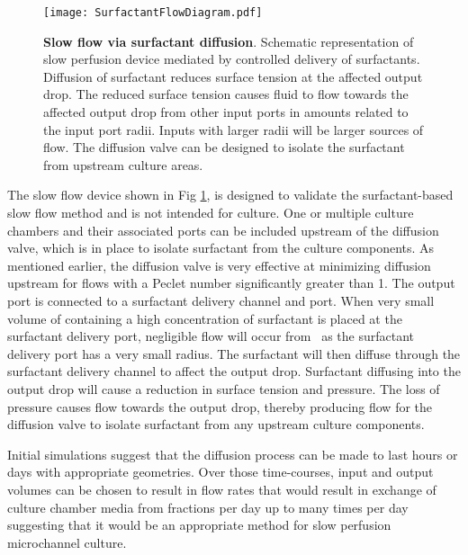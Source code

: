 \begin{figure}[!ht]
\centering
\texttt{[image: SurfactantFlowDiagram.pdf]}
\caption{\textbf{Slow flow via surfactant diffusion}. Schematic representation of slow perfusion device mediated by controlled delivery of surfactants. Diffusion of surfactant reduces surface tension at the affected output drop. The reduced surface tension causes fluid to flow towards the affected output drop from other input ports in amounts related to the input port radii. Inputs with larger radii will be larger sources of flow. The diffusion valve can be designed to isolate the surfactant from upstream culture areas.}
\label{fig:surfactantDevices}
\end{figure}

The slow flow device shown in Fig \ref{fig:surfactantDevices}, is designed to validate the surfactant-based slow flow method and is not intended for culture. One or multiple culture chambers and their associated ports can be included upstream of the diffusion valve, which is in place to isolate surfactant from the culture components. As mentioned earlier, the diffusion valve is very effective at minimizing diffusion upstream for flows with a Peclet number significantly greater than 1. The output port is connected to a surfactant delivery channel and port. When very small volume of containing a high concentration of surfactant is placed at the surfactant delivery port, negligible flow will occur from \pp\ as the surfactant delivery port has a very small radius. The surfactant will then diffuse through the surfactant delivery channel to affect the output drop. Surfactant diffusing into the output drop will cause a reduction in surface tension and pressure. The loss of pressure causes flow towards the output drop, thereby producing flow for the diffusion valve to isolate surfactant from any upstream culture components.


Initial simulations suggest that the diffusion process can be made to last hours or days with appropriate geometries. Over those time-courses, input and output volumes can be chosen to result in flow rates that would result in exchange of culture chamber media from fractions per day up to many times per day suggesting that it would be an appropriate method for slow perfusion microchannel culture.

